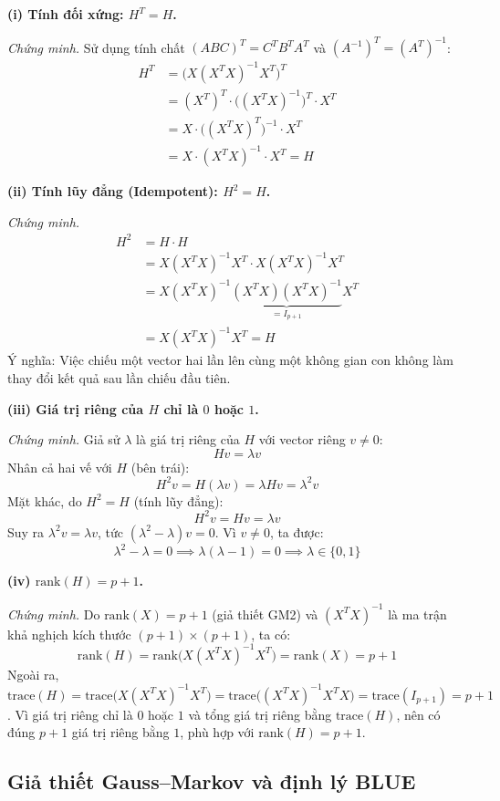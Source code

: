 \documentclass[a4paper]{article}
\begin{document}
\textbf{(i) Tính đối xứng: $H^T = H$.}

\textit{Chứng minh.} Sử dụng tính chất $(ABC)^T = C^TB^TA^T$ và $(A^{-1})^T = (A^T)^{-1}$:
\begin{align*}
H^T &= \bigl(X(X^TX)^{-1}X^T\bigr)^T \\
     &= (X^T)^T \cdot \bigl((X^TX)^{-1}\bigr)^T \cdot X^T \\
     &= X \cdot \bigl((X^TX)^T\bigr)^{-1} \cdot X^T \\
     &= X \cdot (X^TX)^{-1} \cdot X^T = H
\end{align*}

\textbf{(ii) Tính lũy đẳng (Idempotent): $H^2 = H$.}

\textit{Chứng minh.}
\begin{align*}
H^2 &= H \cdot H \\
     &= X(X^TX)^{-1}X^T \cdot X(X^TX)^{-1}X^T \\
     &= X(X^TX)^{-1} \underbrace{(X^TX)(X^TX)^{-1}}_{= I_{p+1}} X^T \\
     &= X(X^TX)^{-1}X^T = H
\end{align*}
Ý nghĩa: Việc chiếu một vector hai lần lên cùng một không gian con không làm thay đổi kết quả sau lần chiếu đầu tiên.

\textbf{(iii) Giá trị riêng của $H$ chỉ là $0$ hoặc $1$.}

\textit{Chứng minh.} Giả sử $\lambda$ là giá trị riêng của $H$ với vector riêng $v \neq 0$:
$$Hv = \lambda v$$
Nhân cả hai vế với $H$ (bên trái):
$$H^2 v = H(\lambda v) = \lambda Hv = \lambda^2 v$$
Mặt khác, do $H^2 = H$ (tính lũy đẳng):
$$H^2 v = Hv = \lambda v$$
Suy ra $\lambda^2 v = \lambda v$, tức $(\lambda^2 - \lambda)v = 0$. Vì $v \neq 0$, ta được:
$$\lambda^2 - \lambda = 0 \implies \lambda(\lambda - 1) = 0 \implies \lambda \in \{0, 1\}$$

\textbf{(iv) $\text{rank}(H) = p + 1$.}

\textit{Chứng minh.} Do $\text{rank}(X) = p + 1$ (giả thiết GM2) và $(X^TX)^{-1}$ là ma trận khả nghịch kích thước $(p+1)\times(p+1)$, ta có:
$$\text{rank}(H) = \text{rank}\bigl(X(X^TX)^{-1}X^T\bigr) = \text{rank}(X) = p + 1$$
Ngoài ra, $\text{trace}(H) = \text{trace}\bigl(X(X^TX)^{-1}X^T\bigr) = \text{trace}\bigl((X^TX)^{-1}X^TX\bigr) = \text{trace}(I_{p+1}) = p + 1$. Vì giá trị riêng chỉ là $0$ hoặc $1$ và tổng giá trị riêng bằng $\text{trace}(H)$, nên có đúng $p+1$ giá trị riêng bằng $1$, phù hợp với $\text{rank}(H) = p+1$. 

\subsection{Giả thiết Gauss--Markov và định lý BLUE}
\end{document}
